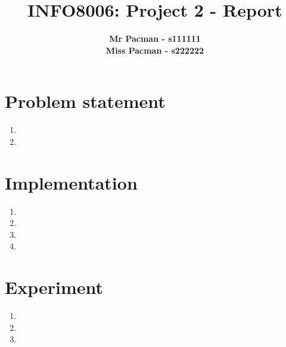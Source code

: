 \documentclass{article}
\begin{document}

\title{\Large{INFO8006: Project 2 - Report}}
\vspace{1cm}
\author{\small{\bf Mr Pacman - s111111} \\ \small{\bf Miss Pacman - s222222}}

\maketitle


\section{Problem statement}

\begin{enumerate}[label=\alph*.]
    \item
    \item
\end{enumerate}

\section{Implementation}

\begin{enumerate}[label=\alph*.]
    \item
    \item
    \item
    \item
\end{enumerate}

\section{Experiment}

\begin{enumerate}[label=\alph*.]
    \item
    \item
    \item
\end{enumerate}



\end{document}
